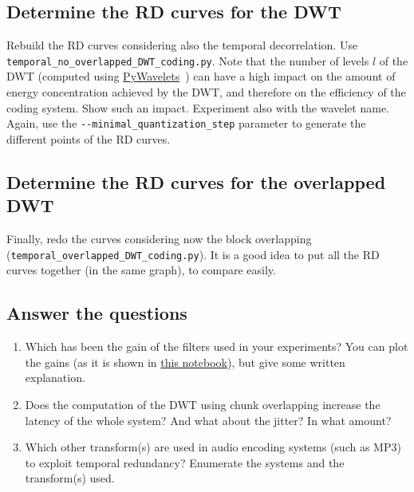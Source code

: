 \subsection{Determine the RD curves for the DWT}

Rebuild the RD curves considering also the temporal decorrelation. Use
\verb|temporal_no_overlapped_DWT_coding.py|. Note that the number of
levels $l$ of the DWT (computed using
\href{https://pywavelets.readthedocs.io/en/latest/}{PyWavelets}~\cite{lee2019pywavelets})
can have a high impact on the amount of energy concentration achieved
by the DWT, and therefore on the efficiency of the coding system. Show
such an impact. Experiment also with the wavelet name. Again, use the
\verb|--minimal_quantization_step| parameter to generate the different
points of the RD curves.


\subsection{Determine the RD curves for the overlapped DWT}

Finally, redo the curves considering now the block overlapping
(\verb|temporal_overlapped_DWT_coding.py|). It is a good idea to put
all the RD curves together (in the same graph), to compare easily.


\subsection{Answer the questions}

\begin{enumerate}
  
\item Which has been the gain of the filters used in your experiments?
  You can plot the gains (as it is shown in
  \href{https://github.com/Tecnologias-multimedia/InterCom/blob/master/docs/2-hours_seminar.ipynb}{this
    notebook}), but give some written explanation.

\item Does the computation of the DWT using chunk overlapping increase
  the latency of the whole system? And what about the jitter? In what amount?

\item Which other transform(s) are used in audio encoding systems
  (such as MP3) to exploit temporal redundancy? Enumerate the
  systems and the transform(s) used.

\end{enumerate}

